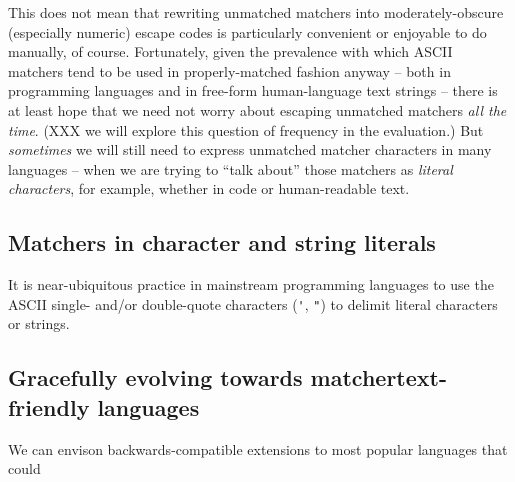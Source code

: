 This does not mean that rewriting unmatched matchers into moderately-obscure
(especially numeric) escape codes
is particularly convenient or enjoyable to do manually, of course.
Fortunately, given the prevalence with which ASCII matchers
tend to be used in properly-matched fashion anyway --
both in programming languages and in free-form human-language text strings --
there is at least hope that we need not worry about escaping unmatched matchers
\emph{all the time}.
(XXX we will explore this question of frequency in the evaluation.)
But \emph{sometimes} we will still need to express
unmatched matcher characters in many languages --
when we are trying to ``talk about'' those matchers
as \emph{literal characters}, for example,
whether in code or human-readable text.

\subsection{Matchers in character and string literals}

It is near-ubiquitous practice in mainstream programming languages 
to use the ASCII single- and/or double-quote characters (\verb|'|, \verb|"|)
to delimit literal characters or strings.

\subsection{Gracefully evolving towards matchertext-friendly languages}

We can envison backwards-compatible extensions to most popular languages
that could 



